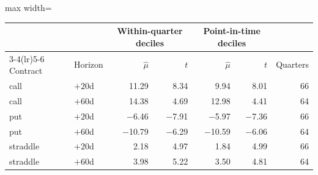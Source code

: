 {\small
\begin{adjustbox}{max width=\linewidth}
\begin{tabular}{llrrrrr}
\toprule
 & & \multicolumn{2}{c}{Within-quarter deciles} & \multicolumn{2}{c}{Point-in-time deciles} & \\
\cmidrule(lr){3-4}\cmidrule(lr){5-6}
Contract & Horizon & $\hat\mu$ & $t$ & $\hat\mu$ & $t$ & Quarters \\
\midrule
call & $+20$d & 11.29 & 8.34 & 9.94 & 8.01 & 66 \\
call & $+60$d & 14.38 & 4.69 & 12.98 & 4.41 & 64 \\
put & $+20$d & $-$6.46 & $-$7.91 & $-$5.97 & $-$7.36 & 66 \\
put & $+60$d & $-$10.79 & $-$6.29 & $-$10.59 & $-$6.06 & 64 \\
straddle & $+20$d & 2.18 & 4.97 & 1.84 & 4.99 & 66 \\
straddle & $+60$d & 3.98 & 5.22 & 3.50 & 4.81 & 64 \\
\bottomrule
\end{tabular}
\end{adjustbox}
}

